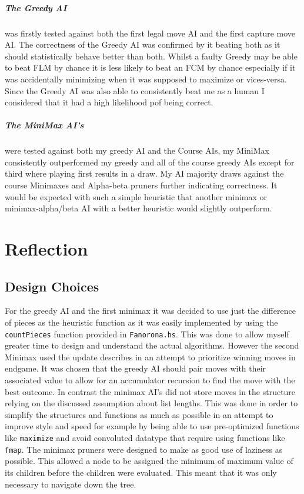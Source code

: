 \documentclass[11pt]{article}
\begin{document}
\subparagraph{The Greedy AI} was firstly tested against both the first legal move AI and the first capture move AI. The correctness of the Greedy AI was confirmed by it beating both as it should statistically behave better than both. Whilst a faulty Greedy may be able to beat FLM by chance it is less likely to beat an FCM by chance especially if it was accidentally minimizing when it was supposed to maximize or vices-versa. Since the Greedy AI was also able to consistently beat me as a human I considered that it had a high likelihood pof being correct.

\subparagraph{The MiniMax AI's} were tested against both my greedy AI and the Course AIs, my MiniMax consistently outperformed my greedy and all of the course greedy AIs except for third where playing first results in a draw. My AI majority draws against the course Minimaxes and Alpha-beta pruners further indicating correctness. It would be expected with such a simple heuristic that another minimax or minimax-alpha/beta AI with a better heuristic would slightly outperform. 




\newpage
\section{Reflection}
  \subsection{Design Choices}
  For the greedy AI and the first minimax it was decided to use just the difference of pieces as the heuristic function as it was easily implemented by using the \verb|countPieces| function provided in \verb|Fanorona.hs|. This was done to allow myself greater time to design and understand the actual algorithms. However the second Minimax used the update describes in an attempt to prioritize winning moves in endgame. It was chosen that the greedy AI should pair moves with their associated value to allow for an accumulator recursion to find the move with the best outcome. In contrast the minimax AI's did not store moves in the structure relying on the discussed assumption about list lengths. This was done in order to simplify the structures and functions as much as possible in an attempt to improve style and speed for example by being able to use pre-optimized functions like \verb|maximize| and avoid convoluted datatype that require using functions like \verb|fmap|. The minimax pruners were designed to make as good use of laziness as possible. This allowed a node to be assigned the minimum of maximum value of its children before the children were evaluated. This meant that it was only necessary to navigate down the tree.
\end{document}
